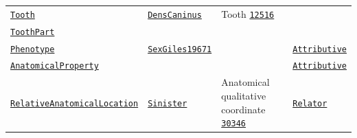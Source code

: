 \documentclass[sw]{iosart2x}
\newcommand{\anno}[1]{\href{https://annosaxfdm.de/ontology/#1}{\texttt{#1}}}
\newcommand{\gfo}[1]{\href{https://www.onto-med.de/ontologies/gfo/#1}{\texttt{#1}}}
\newcommand{\fma}[1]{\href{http://purl.org/sig/ont/fma/fma#1}{\texttt{#1}}}
\begin{document}
\begin{table}[b]
\begin{tabulary}{\textwidth}{llLl}
	\anno{Tooth}					&\anno{DensCaninus}			&Tooth \fma{12516}\\
	\anno{ToothPart}\\%
	\anno{Phenotype}				&\anno{SexGiles19671}			&											&\gfo{Attributive}\\
	\anno{AnatomicalProperty}		&						&													&\gfo{Attributive}\\
	\anno{RelativeAnatomicalLocation}&\anno{Sinister}	&Anatomical qualitative coordinate \fma{30346}	&\gfo{Relator}\\
\bottomrule
\end{tabulary}
\end{table}

\end{document}
